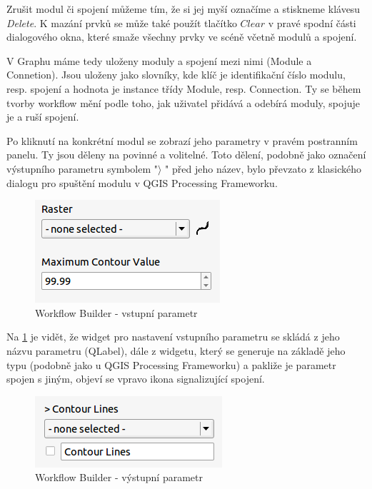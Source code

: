 Zrušit modul či spojení můžeme tím, že si jej myší označíme a stiskneme klávesu \textit{Delete}. K mazání prvků se může také použít tlačítko $Clear$ v pravé spodní části dialogového okna, které smaže všechny prvky ve scéně včetně modulů a spojení.

V Graphu máme tedy uloženy moduly a spojení mezi nimi (Module a Connetion). Jsou uloženy jako slovníky, kde klíč je identifikační číslo modulu, resp. spojení a hodnota je instance třídy Module, resp. Connection. Ty se během tvorby workflow mění podle toho, jak uživatel přidává a odebírá moduly, spojuje je a ruší spojení.


Po kliknutí na konkrétní modul se zobrazí jeho parametry v pravém postranním panelu. Ty jsou děleny na povinné a volitelné. Toto dělení, podobně jako označení výstupního parametru symbolem "$\rangle$ " před jeho název, bylo převzato z klasického dialogu pro spuštění modulu v QGIS Processing Frameworku. \\

\begin{figure}[h]
	\centering
	\includegraphics[scale=0.9]{pictures/wf/wf_inPar}
	\caption{Workflow Builder - vstupní parametr}
  	\label{wf:inPar}
\end{figure}

Na \figurename \ref{wf:inPar} je vidět, že widget pro nastavení vstupního parametru se skládá z jeho názvu parametru (QLabel), dále z widgetu, který se generuje na základě jeho typu (podobně jako u QGIS Processing Frameworku) a pakliže je parametr spojen s jiným, objeví se vpravo ikona signalizující spojení. \\

\begin{figure}[h]
	\centering
	\includegraphics[scale=1.0]{pictures/wf/wf_outPar}
	\caption{Workflow Builder - výstupní parametr}
  	\label{wf:outPar}
\end{figure}

